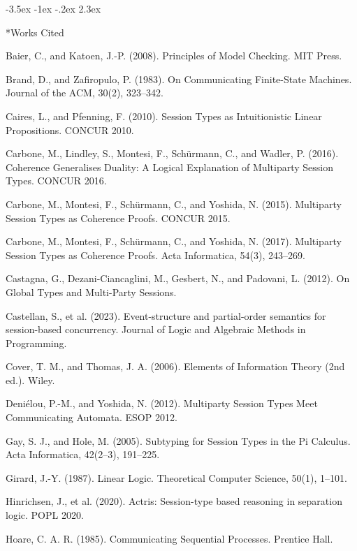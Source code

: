 \documentclass[a4paper,10pt,twocolumn,english]{article}
\makeatletter
\renewcommand{\section}{\@startsection{section}{1}{\z@}%
  {-3.5ex \@plus -1ex \@minus -.2ex}%
  {2.3ex}%
  {\raggedright\normalfont\large\bfseries}}
\numberwithin{equation}{section}
\theoremstyle{paperdef}
\theoremstyle{paperplain}
\theoremstyle{paperdef}
\theoremstyle{paperremark}
\newenvironment{citelist}{%
  \begin{list}{}{%
    \setlength{\leftmargin}{1.25em}%
    \setlength{\itemindent}{-1.25em}%
    \setlength{\itemsep}{2pt}%
    \setlength{\parsep}{0pt}%
    \setlength{\topsep}{3pt}}%
}{\end{list}}
\makeatother
\begin{document}
\section*{Works Cited}

\begin{citelist}
	\item Baier, C., and Katoen, J.-P. (2008). Principles of Model Checking. MIT Press.
	\item Brand, D., and Zafiropulo, P. (1983). On Communicating Finite-State Machines. Journal of the ACM, 30(2), 323--342.
	\item Caires, L., and Pfenning, F. (2010). Session Types as Intuitionistic Linear Propositions. CONCUR 2010.
	\item Carbone, M., Lindley, S., Montesi, F., Sch\"urmann, C., and Wadler, P. (2016). Coherence Generalises Duality: A Logical Explanation of Multiparty Session Types. CONCUR 2016.
	\item Carbone, M., Montesi, F., Sch\"urmann, C., and Yoshida, N. (2015). Multiparty Session Types as Coherence Proofs. CONCUR 2015.
	\item Carbone, M., Montesi, F., Sch\"urmann, C., and Yoshida, N. (2017). Multiparty Session Types as Coherence Proofs. Acta Informatica, 54(3), 243--269.
	\item Castagna, G., Dezani-Ciancaglini, M., Gesbert, N., and Padovani, L. (2012). On Global Types and Multi-Party Sessions.
	\item Castellan, S., et al. (2023). Event-structure and partial-order semantics for session-based concurrency. Journal of Logic and Algebraic Methods in Programming.
	\item Cover, T. M., and Thomas, J. A. (2006). Elements of Information Theory (2nd ed.). Wiley.
	\item Deni\'{e}lou, P.-M., and Yoshida, N. (2012). Multiparty Session Types Meet Communicating Automata. ESOP 2012.
	\item Gay, S. J., and Hole, M. (2005). Subtyping for Session Types in the Pi Calculus. Acta Informatica, 42(2--3), 191--225.
	\item Girard, J.-Y. (1987). Linear Logic. Theoretical Computer Science, 50(1), 1--101.
	\item Hinrichsen, J., et al. (2020). Actris: Session-type based reasoning in separation logic. POPL 2020.
	\item Hoare, C. A. R. (1985). Communicating Sequential Processes. Prentice Hall.

\end{citelist}
\end{document}
